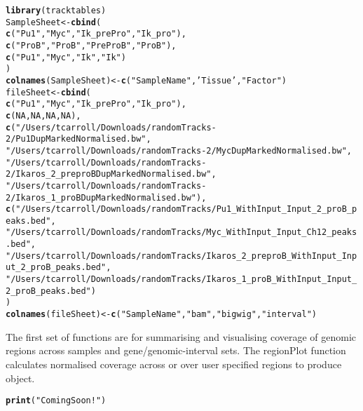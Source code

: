 \documentclass[12pt]{article}\usepackage[]{graphicx}\usepackage[usenames,dvipsnames]{color}
\makeatletter
\newcommand{\hlnum}[1]{\textcolor[rgb]{0.686,0.059,0.569}{#1}}%
\newcommand{\hlstr}[1]{\textcolor[rgb]{0.192,0.494,0.8}{#1}}%
\newcommand{\hlstd}[1]{\textcolor[rgb]{0.345,0.345,0.345}{#1}}%
\newcommand{\hlkwb}[1]{\textcolor[rgb]{0.69,0.353,0.396}{#1}}%
\newcommand{\hlkwd}[1]{\textcolor[rgb]{0.737,0.353,0.396}{\textbf{#1}}}%
\newenvironment{kframe}{%
 \def\at@end@of@kframe{}%
 \ifinner\ifhmode%
  \def\at@end@of@kframe{\end{minipage}}%
  \begin{minipage}{\columnwidth}%
 \fi\fi%
 \def\FrameCommand##1{\hskip\@totalleftmargin \hskip-\fboxsep
 \colorbox{shadecolor}{##1}\hskip-\fboxsep
     \hskip-\linewidth \hskip-\@totalleftmargin \hskip\columnwidth}%
 \MakeFramed {\advance\hsize-\width
   \@totalleftmargin\z@ \linewidth\hsize
   \@setminipage}}%
 {\par\unskip\endMakeFramed%
 \at@end@of@kframe}
\newenvironment{knitrout}{}{} %
\makeatother
\begin{document}
\begin{knitrout}
\color{fgcolor}\begin{kframe}
\begin{alltt}
\hlkwd{library}\hlstd{(tracktables)}
\hlstd{SampleSheet} \hlkwb{<-} \hlkwd{cbind}\hlstd{(}
  \hlkwd{c}\hlstd{(}\hlstr{"Pu1"}\hlstd{,}\hlstr{"Myc"}\hlstd{,}\hlstr{"Ik_prePro"}\hlstd{,}\hlstr{"Ik_pro"}\hlstd{),}
  \hlkwd{c}\hlstd{(}\hlstr{"ProB"}\hlstd{,}\hlstr{"ProB"}\hlstd{,}\hlstr{"PreProB"}\hlstd{,}\hlstr{"ProB"}\hlstd{),}
  \hlkwd{c}\hlstd{(}\hlstr{"Pu1"}\hlstd{,}\hlstr{"Myc"}\hlstd{,}\hlstr{"Ik"}\hlstd{,}\hlstr{"Ik"}\hlstd{)}
\hlstd{)}
\hlkwd{colnames}\hlstd{(SampleSheet)} \hlkwb{<-} \hlkwd{c}\hlstd{(}\hlstr{"SampleName"}\hlstd{,}\hlstr{'Tissue'}\hlstd{,}\hlstr{"Factor"}\hlstd{)}
\hlstd{fileSheet} \hlkwb{<-} \hlkwd{cbind}\hlstd{(}
  \hlkwd{c}\hlstd{(}\hlstr{"Pu1"}\hlstd{,}\hlstr{"Myc"}\hlstd{,}\hlstr{"Ik_prePro"}\hlstd{,}\hlstr{"Ik_pro"}\hlstd{),}
  \hlkwd{c}\hlstd{(}\hlnum{NA}\hlstd{,}\hlnum{NA}\hlstd{,}\hlnum{NA}\hlstd{,}\hlnum{NA}\hlstd{),}
  \hlkwd{c}\hlstd{(}\hlstr{"/Users/tcarroll/Downloads/randomTracks-2/Pu1DupMarkedNormalised.bw"}\hlstd{,}
    \hlstr{"/Users/tcarroll/Downloads/randomTracks-2/MycDupMarkedNormalised.bw"}\hlstd{,}
    \hlstr{"/Users/tcarroll/Downloads/randomTracks-2/Ikaros_2_preproBDupMarkedNormalised.bw"}\hlstd{,}
    \hlstr{"/Users/tcarroll/Downloads/randomTracks-2/Ikaros_1_proBDupMarkedNormalised.bw"}\hlstd{),}
  \hlkwd{c}\hlstd{(}\hlstr{"/Users/tcarroll/Downloads/randomTracks/Pu1_WithInput_Input_2_proB_peaks.bed"}\hlstd{,}
    \hlstr{"/Users/tcarroll/Downloads/randomTracks/Myc_WithInput_Input_Ch12_peaks.bed"}\hlstd{,}
    \hlstr{"/Users/tcarroll/Downloads/randomTracks/Ikaros_2_preproB_WithInput_Input_2_proB_peaks.bed"}\hlstd{,}
    \hlstr{"/Users/tcarroll/Downloads/randomTracks/Ikaros_1_proB_WithInput_Input_2_proB_peaks.bed"}\hlstd{)}
\hlstd{)}
\hlkwd{colnames}\hlstd{(fileSheet)} \hlkwb{<-} \hlkwd{c}\hlstd{(}\hlstr{"SampleName"}\hlstd{,}\hlstr{"bam"}\hlstd{,}\hlstr{"bigwig"}\hlstd{,}\hlstr{"interval"}\hlstd{)}
\end{alltt}
\end{kframe}
\end{knitrout}

The first set of functions are for summarising and visualising coverage of genomic regions across samples and gene/genomic-interval sets.
The regionPlot function calculates normalised coverage across or over user specified regions to produce  object.

\begin{knitrout}
\color{fgcolor}\begin{kframe}
\begin{alltt}
\hlkwd{print}\hlstd{(}\hlstr{"Coming Soon!"}\hlstd{)}
\end{alltt}
\end{kframe}
\end{knitrout}


\end{document}
